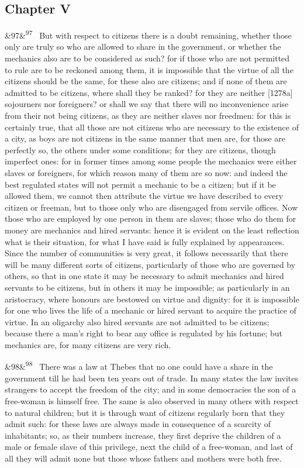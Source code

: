 \documentclass[12pt]{article}
\newcommand{\para}[1][]{\par\noindent\ifx&#1&\else\textsuperscript{\footnotesize #1}~\fi}
\begin{document}
\subsection*{Chapter V}

\para[97] But with respect to citizens there is a doubt remaining, whether those only are truly so who are allowed to share in the government, or whether the mechanics also are to be considered as such? for if those who are not permitted to rule are to be reckoned among them, it is impossible that the virtue of all the citizens should be the same, for these also are citizens; and if none of them are admitted to be citizens, where shall they be ranked? for they are neither [1278a] sojourners nor foreigners? or shall we say that there will no inconvenience arise from their not being citizens, as they are neither slaves nor freedmen: for this is certainly true, that all those are not citizens who are necessary to the existence of a city, as boys are not citizens in the same manner that men are, for those are perfectly so, the others under some conditions; for they are citizens, though imperfect ones: for in former times among some people the mechanics were either slaves or foreigners, for which reason many of them are so now: and indeed the best regulated states will not permit a mechanic to be a citizen; but if it be allowed them, we cannot then attribute the virtue we have described to every citizen or freeman, but to those only who are disengaged from servile offices. Now those who are employed by one person in them are slaves; those who do them for money are mechanics and hired servants: hence it is evident on the least reflection what is their situation, for what I have said is fully explained by appearances. Since the number of communities is very great, it follows necessarily that there will be many different sorts of citizens, particularly of those who are governed by others, so that in one state it may be necessary to admit mechanics and hired servants to be citizens, but in others it may be impossible; as particularly in an aristocracy, where honours are bestowed on virtue and dignity: for it is impossible for one who lives the life of a mechanic or hired servant to acquire the practice of virtue. In an oligarchy also hired servants are not admitted to be citizens; because there a man's right to bear any office is regulated by his fortune; but mechanics are, for many citizens are very rich.

\para[98] There was a law at Thebes that no one could have a share in the government till he had been ten years out of trade. In many states the law invites strangers to accept the freedom of the city; and in some democracies the son of a free-woman is himself free. The same is also observed in many others with respect to natural children; but it is through want of citizens regularly born that they admit such: for these laws are always made in consequence of a scarcity of inhabitants; so, as their numbers increase, they first deprive the children of a male or female slave of this privilege, next the child of a free-woman, and last of all they will admit none but those whose fathers and mothers were both free.
\end{document}
